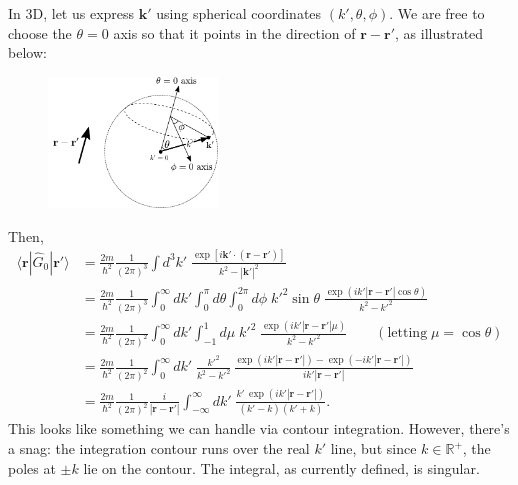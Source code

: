 \documentclass[pra,12pt]{revtex4}
\begin{document}
\clearpage

In 3D, let us express $\mathbf{k}'$ using spherical coordinates
$(k',\theta,\phi)$.  We are free to choose the $\theta=0$ axis so that
it points in the direction of $\mathbf{r}-\mathbf{r}'$, as illustrated
below:

\begin{figure}[h]
  \centering\includegraphics[width=0.4\textwidth]{spherical_coords}
\end{figure}

Then,
\begin{align}
  \langle\mathbf{r}|\hat{G}_0|\mathbf{r}'\rangle &= \frac{2m}{\hbar^2} \frac{1}{(2\pi)^3} \int d^3k' \; \frac{\exp\left[i\mathbf{k}'\cdot (\mathbf{r}-\mathbf{r}')\right]}{k^2-|\mathbf{k}'|^2} \nonumber \\
  &= \frac{2m}{\hbar^2} \frac{1}{(2\pi)^3} \int_0^\infty dk' \int_0^\pi d\theta \int_{0}^{2\pi} d\phi \;{k'}^{2}\sin\theta\; \frac{\displaystyle \exp\left(ik'|\mathbf{r}-\mathbf{r}'|\cos\theta\right)}{k^2-{k'}^2} \nonumber \\
  &= \frac{2m}{\hbar^2} \frac{1}{(2\pi)^2} \int_0^\infty dk' \int_{-1}^1 d\mu \;{k'}^2\; \frac{\displaystyle \exp\left(ik'|\mathbf{r}-\mathbf{r}'|\mu\right)}{k^2-{k'}^2} \qquad(\text{letting}\;\mu = \cos\theta) \nonumber \\
  &= \frac{2m}{\hbar^2} \frac{1}{(2\pi)^2} \int_0^\infty dk' \; \frac{ {k'}^2}{k^2-{k'}^2}\, \frac{\displaystyle \exp\left(ik'|\mathbf{r}-\mathbf{r}'|\right) - \exp\left(-ik'|\mathbf{r}-\mathbf{r}'|\right)}{ik'|\mathbf{r}-\mathbf{r}'|} \nonumber\\
  &= \frac{2m}{\hbar^2} \frac{1}{(2\pi)^2} \frac{i}{|\mathbf{r}-\mathbf{r}'|} \int_{-\infty}^\infty dk' \; \frac{\displaystyle k'\, \exp\left(ik'|\mathbf{r}-\mathbf{r}'|\right)}{(k' - k)(k'+k)}.
  \label{rGrintegrand}
\end{align}
This looks like something we can handle via contour integration.
However, there's a snag: the integration contour runs over the real
$k'$ line, but since $k \in \mathbb{R}^+$, the poles at $\pm k$ lie on
the contour.  The integral, as currently defined, is singular.
\end{document}
